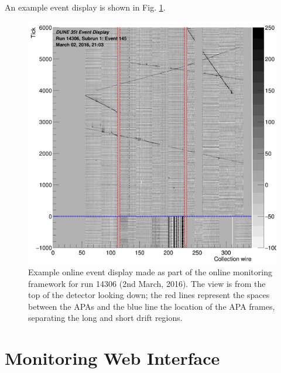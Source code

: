 An example event display is shown in Fig. \ref{fig:EVD}.

\begin{figure}
  \centering
  \includegraphics[width=14cm]{evd.png}
  \caption{Example online event display made as part of the online monitoring framework for run 14306 (2nd March, 2016).  The view is from the top of the detector looking down; the red lines represent the spaces between the APAs and the blue line the location of the APA frames, separating the long and short drift regions.}
  \label{fig:EVD}
\end{figure}

\section{Monitoring Web Interface}\label{sec:WebInterface}


